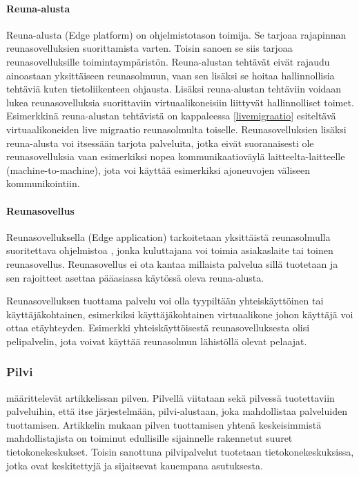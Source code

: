 \paragraph{Reuna-alusta}
Reuna-alusta (Edge platform) on ohjelmistotason toimija. Se tarjoaa rajapinnan reunasovelluksien suorittamista varten\cite{etsirefarch}. Toisin sanoen se siis tarjoaa reunasovelluksille toimintaympäristön.
Reuna-alustan tehtävät eivät rajaudu ainoastaan yksittäiseen reunasolmuun, vaan sen lisäksi se hoitaa hallinnollisia tehtäviä kuten tietoliikenteen ohjausta. Lisäksi reuna-alustan tehtäviin voidaan lukea reunasovelluksia suorittaviin virtuaalikoneisiin liittyvät hallinnolliset toimet. Esimerkkinä reuna-alustan tehtävistä on kappaleessa \ref{livemigraatio} esiteltävä virtuaalikoneiden live migraatio reunasolmulta toiselle.
Reunasovelluksien lisäksi reuna-alusta voi itsessään tarjota palveluita, jotka eivät suoranaisesti ole reunasovelluksia vaan esimerkiksi nopea kommunikaatioväylä laitteelta-laitteelle (machine-to-machine), jota voi käyttää esimerkiksi ajoneuvojen väliseen kommunikointiin.

\paragraph{Reunasovellus}
Reunasovelluksella (Edge application) tarkoitetaan yksittäistä reunasolmulla suoritettava ohjelmistoa \cite{etsirefarch}, jonka kuluttajana voi toimia asiakaslaite tai toinen reunasovellus. Reunasovellus ei ota kantaa millaista palvelua sillä tuotetaan ja sen rajoitteet asettaa pääasiassa käytössä oleva reuna-alusta. 

Reunasovelluksen tuottama palvelu voi olla tyypiltään yhteiskäyttöinen tai käyttäjäkohtainen, esimerkiksi käyttäjäkohtainen virtuaalikone johon käyttäjä voi ottaa etäyhteyden. Esimerkki yhteiskäyttöisestä reunasovelluksesta olisi pelipalvelin, jota voivat käyttää reunasolmun lähistöllä olevat pelaajat. 

\subsubsection{Pilvi}
\cite{armbrust2010view} määrittelevät artikkelissan pilven. 
Pilvellä viitataan sekä pilvessä tuotettaviin palveluihin, että itse järjestelmään, pilvi-alustaan, joka mahdollistaa palveluiden tuottamisen.
Artikkelin mukaan pilven tuottamisen yhtenä keskeisimmistä mahdollistajista on toiminut edullisille sijainnelle rakennetut suuret tietokonekeskukset.
Toisin sanottuna pilvipalvelut tuotetaan tietokonekeskuksissa, jotka ovat keskitettyjä ja sijaitsevat kauempana asutuksesta. 

